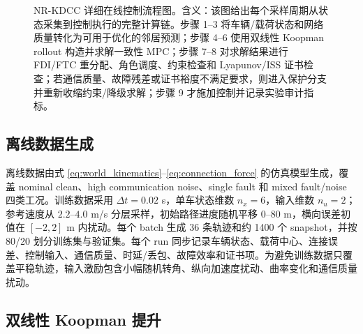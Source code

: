 \documentclass[twocolumn,3p,times,procedia]{elsarticle}
\newcommand{\Method}{NR-KDCC}
\begin{document}
\begin{figure}[t]
{}
\caption{\Method{} 详细在线控制流程图。含义：该图给出每个采样周期从状态采集到控制执行的完整计算链。步骤 1--3 将车辆/载荷状态和网络质量转化为可用于优化的邻居预测；步骤 4--6 使用双线性 Koopman rollout 构造并求解一致性 MPC；步骤 7--8 对求解结果进行 FDI/FTC 重分配、角色调度、约束检查和 Lyapunov/ISS 证书检查；若通信质量、故障残差或证书裕度不满足要求，则进入保护分支并重新收缩约束/降级求解；步骤 9 才施加控制并记录实验审计指标。}
\label{fig:nrkdcc_flowchart}
\end{figure}

\subsection{离线数据生成}

离线数据由式 \eqref{eq:world_kinematics}--\eqref{eq:connection_force} 的仿真模型生成，覆盖 nominal clean、high communication noise、single fault 和 mixed fault/noise 四类工况。训练数据采用 $\Delta t=0.02$ s，单车状态维数 $n_x=6$，输入维数 $n_u=2$；参考速度从 $2.2$--$4.0$ m/s 分层采样，初始路径进度随机平移 $0$--$80$ m，横向误差初值在 $[-2,2]$ m 内扰动。每个 batch 生成 36 条轨迹和约 1400 个 snapshot，并按 80/20 划分训练集与验证集。每个 run 同步记录车辆状态、载荷中心、连接误差、控制输入、通信质量、时延/丢包、故障效率和证书项。为避免训练数据只覆盖平稳轨迹，输入激励包含小幅随机转角、纵向加速度扰动、曲率变化和通信质量扰动。

\subsection{双线性 Koopman 提升}
\end{document}
